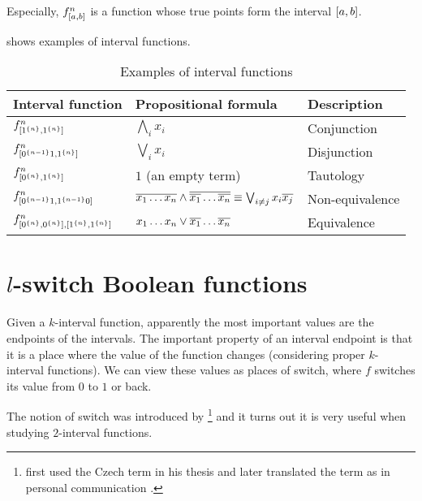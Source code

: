 Especially,
$f^{n}_{[a, b]}$ is a function
whose true points form the interval $[a, b]$.

shows examples of interval functions.

\begin{table}[h]
\centering
\begin{tabular}{lll}
Interval function & Propositional formula & Description \\
\hline
$f^{n}_{[1^{\{n\}}, 1^{\{n\}}]}$ &
$\bigwedge_i{x_i}$ & Conjunction \\
$f^{n}_{[0^{\{n-1\}} 1, 1^{\{n\}}]}$ &
$\bigvee_i{x_i}$ & Disjunction \\
$f^{n}_{[0^{\{n\}}, 1^{\{n\}}]}$ &
$1$ (an empty term) & Tautology \\
$f^{n}_{[0^{\{n-1\}} 1, 1^{\{n-1\}} 0]}$ &
$\overline{x_1 \ldots x_n} \wedge
\overline{\overline{x_1} \ldots \overline{x_n}}
\equiv \bigvee_{i \neq j}{x_i \overline{x_j}}$ &
Non-equivalence \\
$f^n_{[0^{\{n\}}, 0^{\{n\}}],
[1^{\{n\}}, 1^{\{n\}}]}$ &
$x_1 \ldots x_n \vee \overline{x_1} \ldots \overline{x_n}$ &
Equivalence
\end{tabular}
\caption{Examples of interval functions}
\label{tab:exampleintfns}
\end{table}

\section{\texorpdfstring{$l$}{l}-switch Boolean functions}

Given a $k$-interval function,
apparently the most important values are the endpoints of the intervals.
The important property of an interval endpoint is that
it is a place where the value of the function changes
(considering proper $k$-interval functions).
We can view these values as places of switch,
where $f$ switches its value from $0$ to $1$ or back.

The notion of switch was introduced by \citeauthor{Husek2014}\footnote{
\citeauthor{Husek2014} first used the Czech term
in his thesis \citep[p.~13]{Husek2014}
and later translated the term as 
in personal communication \citep{Husek2015}.
}
and it turns out it is very useful when studying $2$-interval functions.

